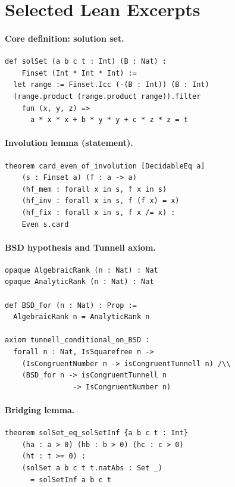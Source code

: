 \documentclass[11pt,a4paper]{article}
\theoremstyle{definition}
\begin{document}
\section{Selected Lean Excerpts}\label{app:code}

\paragraph{Core definition: solution set.}
\begin{lstlisting}
def solSet (a b c t : Int) (B : Nat) :
    Finset (Int * Int * Int) :=
  let range := Finset.Icc (-(B : Int)) (B : Int)
  (range.product (range.product range)).filter
    fun (x, y, z) =>
      a * x * x + b * y * y + c * z * z = t
\end{lstlisting}

\paragraph{Involution lemma (statement).}
\begin{lstlisting}
theorem card_even_of_involution [DecidableEq a]
    (s : Finset a) (f : a -> a)
    (hf_mem : forall x in s, f x in s)
    (hf_inv : forall x in s, f (f x) = x)
    (hf_fix : forall x in s, f x /= x) :
    Even s.card
\end{lstlisting}

\paragraph{BSD hypothesis and Tunnell axiom.}
\begin{lstlisting}
opaque AlgebraicRank (n : Nat) : Nat
opaque AnalyticRank (n : Nat) : Nat

def BSD_for (n : Nat) : Prop :=
  AlgebraicRank n = AnalyticRank n

axiom tunnell_conditional_on_BSD :
  forall n : Nat, IsSquarefree n ->
    (IsCongruentNumber n -> isCongruentTunnell n) /\\
    (BSD_for n -> isCongruentTunnell n
                -> IsCongruentNumber n)
\end{lstlisting}

\paragraph{Bridging lemma.}
\begin{lstlisting}
theorem solSet_eq_solSetInf {a b c t : Int}
    (ha : a > 0) (hb : b > 0) (hc : c > 0)
    (ht : t >= 0) :
    (solSet a b c t t.natAbs : Set _)
      = solSetInf a b c t
\end{lstlisting}
\end{document}
